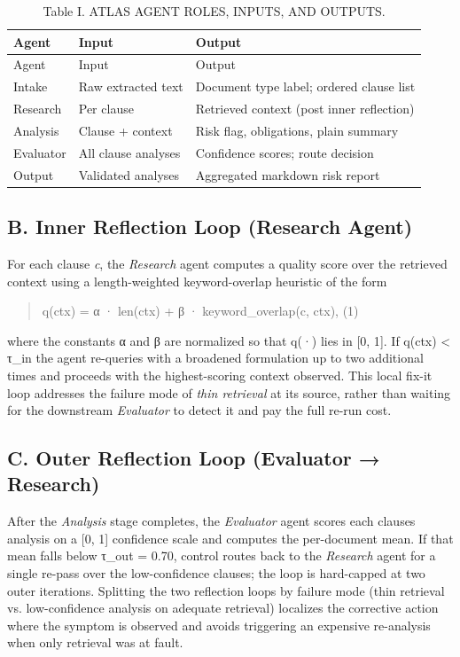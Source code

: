 \documentclass[
  twocolumn]{article}
\begin{document}
\begin{longtable}[]{@{}lll@{}}
\caption{Table I. ATLAS AGENT ROLES, INPUTS, AND
OUTPUTS.}\tabularnewline
\toprule\noalign{}
Agent & Input & Output \\
\midrule\noalign{}
\endfirsthead
\toprule\noalign{}
Agent & Input & Output \\
\midrule\noalign{}
\endhead
\bottomrule\noalign{}
\endlastfoot
Intake & Raw extracted text & Document type label; ordered clause
list \\
Research & Per clause & Retrieved context (post inner reflection) \\
Analysis & Clause + context & Risk flag, obligations, plain summary \\
Evaluator & All clause analyses & Confidence scores; route decision \\
Output & Validated analyses & Aggregated markdown risk report \\
\end{longtable}

\subsection{B. Inner Reflection Loop (Research
Agent)}\label{b.-inner-reflection-loop-research-agent}

For each clause \emph{c}, the \emph{Research} agent computes a quality
score over the retrieved context using a length-weighted keyword-overlap
heuristic of the form

\begin{quote}
q(ctx) = α · len(ctx) + β · keyword\_overlap(c, ctx), (1)
\end{quote}

where the constants α and β are normalized so that q(·) lies in {[}0,
1{]}. If q(ctx) \textless{} τ\_in the agent re-queries with a broadened
formulation up to two additional times and proceeds with the
highest-scoring context observed. This local fix-it loop addresses the
failure mode of \emph{thin retrieval} at its source, rather than waiting
for the downstream \emph{Evaluator} to detect it and pay the full re-run
cost.

\subsection{C. Outer Reflection Loop (Evaluator →
Research)}\label{c.-outer-reflection-loop-evaluator-research}

After the \emph{Analysis} stage completes, the \emph{Evaluator} agent
scores each clause\textquotesingle s analysis on a {[}0, 1{]} confidence
scale and computes the per-document mean. If that mean falls below
τ\_out = 0.70, control routes back to the \emph{Research} agent for a
single re-pass over the low-confidence clauses; the loop is hard-capped
at two outer iterations. Splitting the two reflection loops by failure
mode (thin retrieval vs. low-confidence analysis on adequate retrieval)
localizes the corrective action where the symptom is observed and avoids
triggering an expensive re-analysis when only retrieval was at fault.
\end{document}

